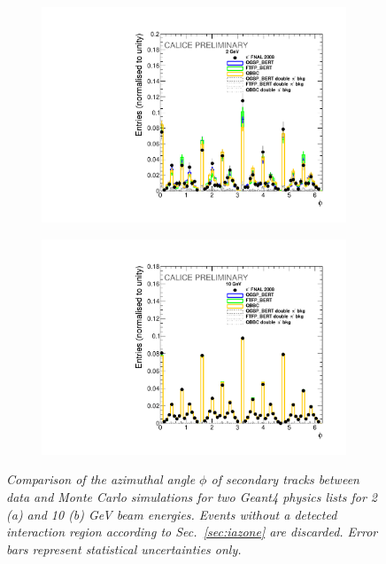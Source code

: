 \begin{figure}
	\centering
	\begin{subfigure}{0.5\textwidth}
		\centering
		\includegraphics[width=.90\linewidth]{ECAL/plots/phi-2.pdf}
		\caption{\label{fig:phi2} }
	\end{subfigure}%
	\begin{subfigure}{0.5\textwidth}
		\centering
		\includegraphics[width=.90\linewidth]{ECAL/plots/phi-10.pdf}
		\caption{\label{fig:phi10} }
	\end{subfigure}
	\caption{\label{fig:phiexample} \sl Comparison of the azimuthal angle $\phi$ of secondary tracks between data and Monte Carlo simulations for two {\sc Geant}4 physics lists for 2 (a) and 10 (b) GeV beam energies. Events without a detected interaction region according to Sec.~\ref{sec:iazone} are discarded. Error bars represent statistical uncertainties only.}
\end{figure}


